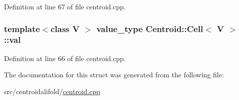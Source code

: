 Definition at line 67 of file centroid.\+cpp.

\hypertarget{struct_centroid_1_1_cell_ab9c512795d366466b23ea0e0c84535aa}{
\subsubsection[{val}]{\setlength{\rightskip}{0pt plus 5cm}template$<$class V $>$ {\bf value\+\_\+type} {\bf Centroid\+::\+Cell}$<$ V $>$\+::val}}\label{struct_centroid_1_1_cell_ab9c512795d366466b23ea0e0c84535aa}


Definition at line 66 of file centroid.\+cpp.



The documentation for this struct was generated from the following file\+:\begin{DoxyCompactItemize}
\item 
src/centroidalifold/\hyperlink{centroid_8cpp}{centroid.\+cpp}\end{DoxyCompactItemize}
